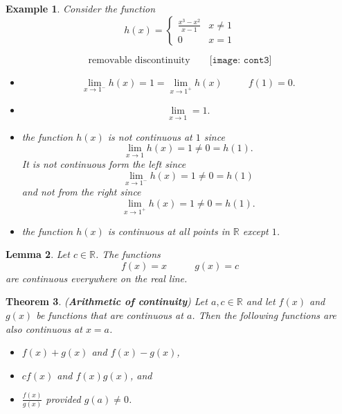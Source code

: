 \documentclass[12pt,a4paper]{book}
\newtheorem{theorem}{Theorem}[section]
\newtheorem{lemma}[theorem]{Lemma}
\newtheorem{Example}[theorem]{Example}
\numberwithin{equation}{section}
\newtheorem*{definition}{Definition}
\begin{document}
	\begin{tcolorbox}[width=\textwidth,colback={green!20},title={},colbacktitle=yellow,coltitle=blue] 
\begin{Example}
	Consider the function 
	$$h(x)=\begin{cases}
	\frac{x^3-x^2}{x-1} & x\neq 1\\
	0 & x=1
	\end{cases}$$
	\begin{mdframed}
		$$\text{removable discontinuity}\quad \quad 
		\texttt{[image: cont3]}
		$$
	\end{mdframed}
	\begin{itemize}
		\item $$\lim_{x\to 1^{-}}h(x)=1=\lim_{x\to 1^{+}}h(x)~~~~~~~~~~~~f(1)=0.$$
		\item $$\lim_{x\to 1}=1.$$
		\item the function $h(x)$ is not continuous at $1$ since $$\lim_{x\to 1}h(x)=1\neq 0=h(1).$$ It is not continuous form the left since $$\lim_{x\to 1^{-}}h(x)=1\neq 0=h(1)$$ and not from the right since $$\lim_{x\to 1^{+}}h(x)=1\neq 0=h(1).$$
		\item the function $h(x)$ is continuous at all points in $\mathbb{R}$ except $1$. 
	\end{itemize}
\end{Example}
\end{tcolorbox}
%
\begin{tcolorbox}[width=\textwidth,colback={green!20},title={},colbacktitle=yellow,coltitle=blue] 
\begin{lemma}
	Let $c\in \mathbb{R}$. The functions 
	$$f(x)=x~~~~~~~~~~~~~g(x)=c$$
	are continuous everywhere on the real line.
\end{lemma}
\end{tcolorbox}

\begin{tcolorbox}[width=\textwidth,colback={green!20},title={},colbacktitle=yellow,coltitle=blue] 
\begin{theorem} ({\bf Arithmetic of continuity})
	Let $a,c\in \mathbb{R}$ and let $f(x)$ and $g(x)$ be functions that are continuous at $a$. Then the following functions are also continuous at $x=a$.
	\begin{itemize}
		\item $f(x)+g(x)$ and $f(x)-g(x)$,
		\item $cf(x)$ and $f(x)g(x)$, and 
		\item $\frac{f(x)}{g(x)}$ provided $g(a)\neq 0$. 
	\end{itemize}
\end{theorem}
\end{tcolorbox}
\end{document}
